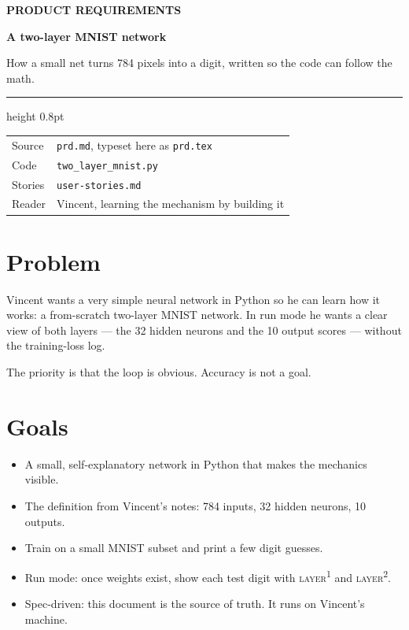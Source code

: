 \documentclass[11pt]{article}
\newcommand{\pill}[2]{%
  \tcbox[on line, colback=#1!12, colframe=#1!45, boxrule=0.4pt,
         arc=2pt, left=4pt, right=4pt, top=1.5pt, bottom=1.5pt,
         fontupper=\sffamily\bfseries\scriptsize\color{#1!80!black}]{#2}%
}
\begin{document}
\noindent
{\sffamily\color{cyanlayer}\bfseries\small PRODUCT REQUIREMENTS}
\hfill
\pill{cyanlayer}{implemented}\quad
\pill{muted}{pure Python}

\vspace{0.55em}
{\sffamily\bfseries\fontsize{26}{30}\selectfont A two-layer MNIST network\par}
\vspace{0.35em}
{\large\color{muted} How a small net turns 784 pixels into a digit, written so the code can follow the math.\par}

\vspace{0.7em}
{\color{line}\hrule height 0.8pt}
\vspace{0.9em}

\noindent
\begin{tabular}{@{}l l@{}}
\sffamily\small\color{muted} Source & \texttt{prd.md}, typeset here as \texttt{prd.tex} \\[2pt]
\sffamily\small\color{muted} Code & \texttt{two\_layer\_mnist.py} \\[2pt]
\sffamily\small\color{muted} Stories & \texttt{user-stories.md} \\[2pt]
\sffamily\small\color{muted} Reader & Vincent, learning the mechanism by building it \\
\end{tabular}

\vspace{1.15em}

\section*{Problem}

Vincent wants a very simple neural network in Python so he can learn how it works: a from-scratch two-layer MNIST network. In run mode he wants a clear view of both layers --- the 32 hidden neurons and the 10 output scores --- without the training-loss log.

The priority is that the loop is obvious. Accuracy is not a goal.

\section*{Goals}

\begin{itemize}
  \item A small, self-explanatory network in Python that makes the mechanics visible.
  \item The definition from Vincent's notes: 784 inputs, 32 hidden neurons, 10 outputs.
  \item Train on a small MNIST subset and print a few digit guesses.
  \item Run mode: once weights exist, show each test digit with \textsc{layer}\textsuperscript{1} and \textsc{layer}\textsuperscript{2}.
  \item Spec-driven: this document is the source of truth. It runs on Vincent's machine.
\end{itemize}
\end{document}
